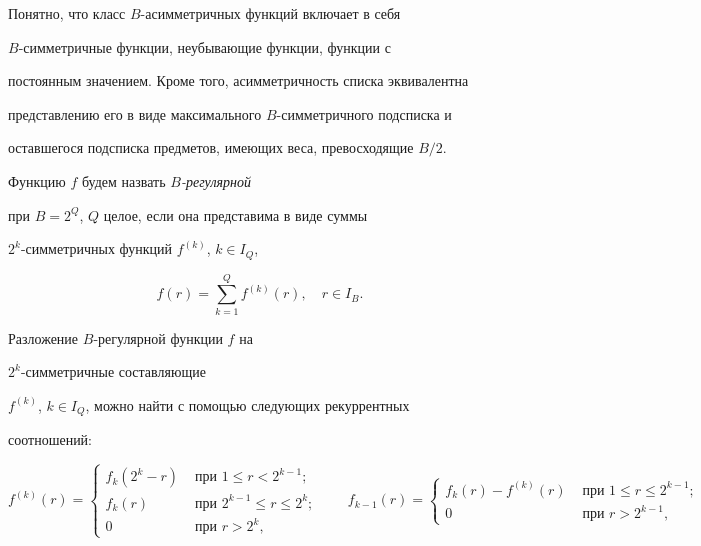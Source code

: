Понятно, что класс $B$-асимметричных функций включает в себя


$B$-симметричные функции, неубывающие функции, функции с


постоянным значением. Кроме того, асимметричность списка эквивалентна


представлению его в виде максимального $B$-симметричного подсписка и


оставшегося подсписка предметов, имеющих веса, превосходящие $B/2$.





Функцию $f$ будем назвать {\em $B$-регулярной}


при $B=2^{Q}$, $Q$ целое, если она представима в виде суммы


$2^{k}$-симметричных функций $f^{(k)}$, $k \in I_{Q}$,


$$


f(r)=\sum_{k=1}^{Q}f^{(k)}(r),\quad r \in I_{B}.


$$


Разложение $B$-регулярной функции  $f$ на


$2^{k}$-симметричные составляющие


$f^{(k)}$, $k \in I_{Q}$, можно найти с помощью следующих рекуррентных


соотношений:





\begin {equation}


\label {e2}


f^{(k)}(r) =


\begin{cases}


f_{k}(2^{k}-r)& \text { при } 1 \le r<2^{k-1}; \\


f_{k}(r) & \text{ при } 2^{k-1} \le r \le 2^{k}; \\


0 & \text{ при } r > 2^{k},


\end{cases}


\qquad


f_{k-1}(r)=


\begin{cases}


f_{k}(r)-f^{(k)}(r) & \text{ при } 1 \le r\le 2^{k-1}; \\


0 & \text{ при } r > 2^{k-1},


\end{cases}


\end {equation}


